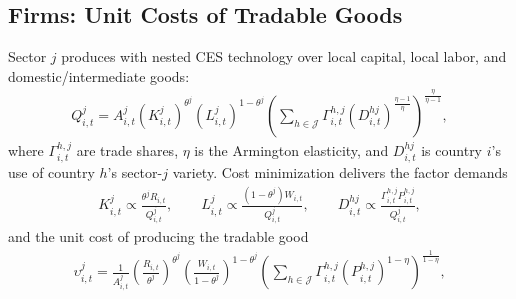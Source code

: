 \documentclass[10pt]{article}
\begin{document}
\subsection*{Firms: Unit Costs of Tradable Goods}
Sector $j$ produces with nested CES technology over local capital, local labor,
and domestic/intermediate goods:
\begin{align}
  Q^j_{i,t} = A^j_{i,t} \left( K^j_{i,t} \right)^{\theta^j}
  \left( L^j_{i,t} \right)^{1 - \theta^j}
  \left( \sum_{h \in \mathcal{J}} \Gamma^{h,j}_{i,t}
  \left( D^{hj}_{i,t} \right)^{\frac{\eta - 1}{\eta}} \right)^{\frac{\eta}{\eta - 1}},
  \label{eq:tech}
\end{align}
where $\Gamma^{h,j}_{i,t}$ are trade shares, $\eta$ is the Armington elasticity,
and $D^{hj}_{i,t}$ is country $i$'s use of country $h$'s sector-$j$ variety.
Cost minimization delivers the factor demands
\begin{align}
  K^j_{i,t} \propto \frac{\theta^j R_{i,t}}{Q^j_{i,t}}, \qquad
  L^j_{i,t} \propto \frac{(1 - \theta^j) W_{i,t}}{Q^j_{i,t}}, \qquad
  D^{hj}_{i,t} \propto \frac{\Gamma^{h,j}_{i,t} P^{h,j}_{i,t}}{Q^j_{i,t}}, \label{eq:foc-k}
\end{align}
and the unit cost of producing the tradable good
\begin{align}
  \upsilon^{j}_{i,t} = \frac{1}{A^j_{i,t}}
  \left( \frac{R_{i,t}}{\theta^j} \right)^{\theta^j}
  \left( \frac{W_{i,t}}{1 - \theta^j} \right)^{1 - \theta^j}
  \left( \sum_{h \in \mathcal{J}} \Gamma^{h,j}_{i,t}
  \left( P^{h,j}_{i,t} \right)^{1 - \eta} \right)^{\frac{1}{1 - \eta}}, \label{eq:unitcost}
\end{align}

\end{document}
